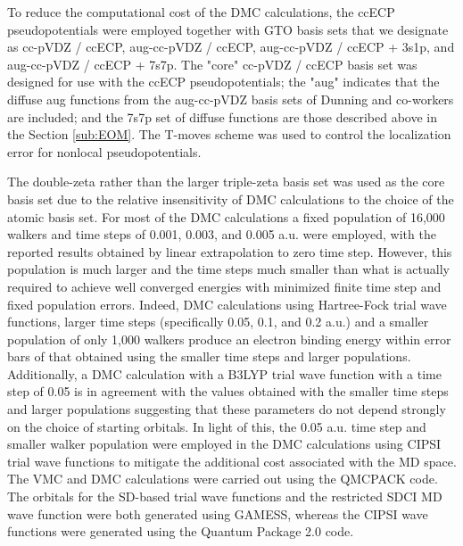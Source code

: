 To reduce the computational cost of the DMC calculations, the ccECP pseudopotentials\cite{10.1063/1.4995643,10.1063/1.5040472} were employed together with GTO basis sets that we designate as cc-pVDZ / ccECP, aug-cc-pVDZ / ccECP, aug-cc-pVDZ / ccECP + 3s1p, and aug-cc-pVDZ / ccECP + 7s7p.
The "core" cc-pVDZ / ccECP\cite{10.1063/1.4995643,10.1063/1.5040472} basis set was designed for use with the ccECP pseudopotentials; the "aug" indicates that the diffuse aug functions from the aug-cc-pVDZ basis sets of Dunning and co-workers are included; and the 7s7p set of diffuse functions are those described above in the Section \ref{sub:EOM}.\cite{10.1063/1.462569}
The T-moves scheme was used to control the localization error for nonlocal pseudopotentials.\cite{10.1103/PhysRevB.74.161102}

The double-zeta rather than the larger triple-zeta basis set was used as the core basis set due to the relative insensitivity of DMC calculations to the choice of the atomic basis set. 
For most of the DMC calculations a fixed population of 16,000 walkers and time steps of 0.001, 0.003, and 0.005 a.u. were employed, with the reported results obtained by linear extrapolation to zero time step.
However, this population is much larger and the time steps much smaller than what is actually required to achieve well converged energies with minimized finite time step and fixed population errors.
Indeed, DMC calculations using Hartree-Fock trial wave functions, larger time steps (specifically 0.05, 0.1, and 0.2 a.u.) and a smaller population of only 1,000 walkers produce an electron binding energy within error bars of that obtained using the smaller time steps and larger populations.
Additionally, a DMC calculation with a B3LYP trial wave function with a time step of 0.05 is in agreement with the values obtained with the smaller time steps and larger populations suggesting that these parameters do not depend strongly on the choice of starting orbitals.
In light of this, the 0.05 a.u. time step and smaller walker population were employed in the DMC calculations using CIPSI trial wave functions to mitigate the additional cost associated with the MD space. 
The VMC and DMC calculations were carried out using the QMCPACK code.\cite{10.1088/1361-648X/aab9c3,10.1063/5.0004860}
The orbitals for the SD-based trial wave functions and the restricted SDCI MD wave function were both generated using GAMESS,\cite{10.1002/jcc.540141112,10.1016/B978-044451719-7/50084-6,10.1063/5.0005188} whereas the CIPSI wave functions were generated using the Quantum Package 2.0 code.\cite{10.1021/acs.jctc.9b00176} 

